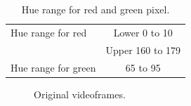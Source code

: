 \begin{table}[h!]
  \centering
  \caption{Hue range for red and green pixel.}
  \label{t:hue_range}
  \begin{tabular}{  l | c  }
    \hline
    Hue range for red & Lower 0 to 10 \\ \cline{2-2}
    & Upper 160 to 179 \\
    \hline \hline
    Hue range for green & 65 to 95 \\
    \hline
  \end{tabular}
\end{table}

\begin{figure}[!ht]
\centering
{}

\caption{Original videoframes.}
\label{f:org_img}
\end{figure}

